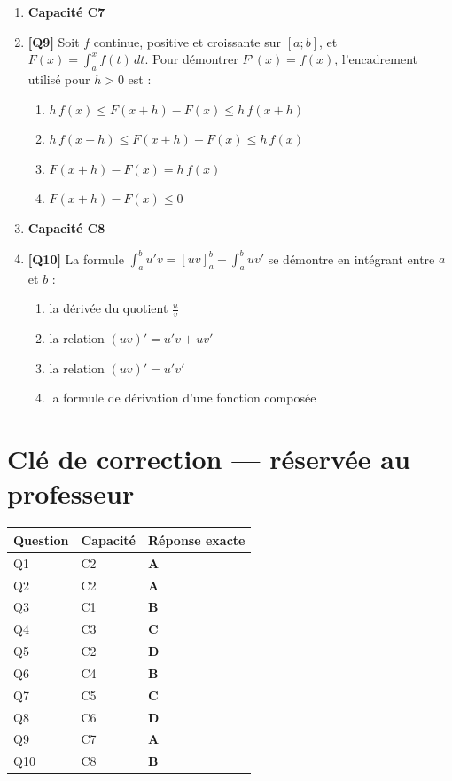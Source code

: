 \begin{enumerate}
\item[] \textbf{Capacité C7}

\item \textbf{[Q9]} Soit $f$ continue, positive et croissante sur $[a;b]$, et $F(x)=\displaystyle\int_a^x f(t)\,dt$. Pour démontrer $F'(x)=f(x)$, l'encadrement utilisé pour $h>0$ est :
  \begin{enumerate}[label=\Alph*.]
    \item $h\,f(x)\leq F(x+h)-F(x)\leq h\,f(x+h)$
    \item $h\,f(x+h)\leq F(x+h)-F(x)\leq h\,f(x)$
    \item $F(x+h)-F(x)=h\,f(x)$
    \item $F(x+h)-F(x)\leq0$
  \end{enumerate}

\item[] \textbf{Capacité C8}

\item \textbf{[Q10]} La formule $\displaystyle\int_a^b u'v=[uv]_a^b-\int_a^b uv'$ se démontre en intégrant entre $a$ et $b$ :
  \begin{enumerate}[label=\Alph*.]
    \item la dérivée du quotient $\tfrac uv$
    \item la relation $(uv)'=u'v+uv'$
    \item la relation $(uv)'=u'v'$
    \item la formule de dérivation d'une fonction composée
  \end{enumerate}

\end{enumerate}

\ifnxVersionProfesseur
\clearpage
\section*{Clé de correction — réservée au professeur}

\begin{center}
\begin{tabular}{lll}
\hline
Question & Capacité & Réponse exacte \\
\hline
Q1 & C2 & \textbf{A} \\
Q2 & C2 & \textbf{A} \\
Q3 & C1 & \textbf{B} \\
Q4 & C3 & \textbf{C} \\
Q5 & C2 & \textbf{D} \\
Q6 & C4 & \textbf{B} \\
Q7 & C5 & \textbf{C} \\
Q8 & C6 & \textbf{D} \\
Q9 & C7 & \textbf{A} \\
Q10 & C8 & \textbf{B} \\
\hline
\end{tabular}
\end{center}

